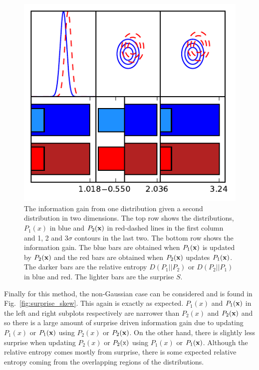 \documentclass[twocolumn]{revtex4-1}
\begin{document}
    \begin{figure}
        \centering
        \includegraphics{../comparison/plots/surprise_2.pdf}
        \caption{The information gain from one distribution given a second distribution in two dimensions.
                 The top row shows the distributions, $P_1(x)$ in blue and $P_2({\bf x})$ in red-dashed lines in the first column and 1, 2 and 3$\sigma$ contours in the last two.
                 The bottom row shows the information gain.
                 The blue bars are obtained when $P_1({\bf x})$ is updated by $P_2({\bf x})$ and the red bars are obtained when $P_2({\bf x})$ updates $P_1({\bf x})$.
                 The darker bars are the relative entropy $D(P_1||P_2)$ or $D(P_2||P_1)$ in blue and red.
                 The lighter bars are the surprise $S$.}
        \label{fig:surprise_2}
    \end{figure}
    \noindent Finally for this method, the non-Gaussian case can be considered and is found in Fig.~\ref{fig:surprise_skew}.
    This again is exactly as expected.
    $P_1(x)$ and $P_1({\bf x})$ in the left and right subplots respectively are narrower than $P_2(x)$ and $P_2({\bf x})$ and so there is a large amount of surprise driven information gain due to updating $P_1(x)$ or $P_1({\bf x})$ using $P_2(x)$ or $P_2({\bf x})$.
    On the other hand, there is slightly less surprise when updating $P_2(x)$ or $P_2({\rm x})$ using $P_1(x)$ or $P_1({\bf x})$.
    Although the relative entropy comes mostly from surprise, there is some expected relative entropy coming from the overlapping regions of the distributions.
\end{document}
